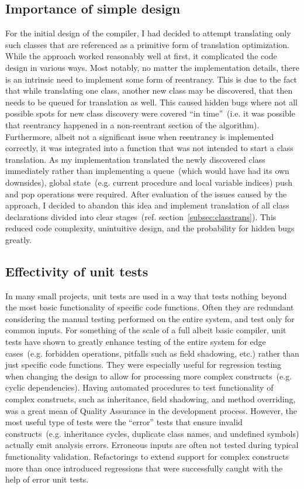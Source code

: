 \documentclass[]{tukportfolio}
\begin{document}
\subsection{Importance of simple design}

For the initial design of the compiler, I had decided to attempt translating only such classes that are referenced as a primitive form of translation optimization. While the approach worked reasonably well at first, it complicated the code design in various ways. Most notably, no matter the implementation details, there is an intrinsic need to implement some form of reentrancy. This is due to the fact that while translating one class, another new class may be discovered, that then needs to be queued for translation as well. This caused hidden bugs where not all possible spots for new class discovery were covered ``in time''~(i.e. it was possible that reentrancy happened in a non-reentrant section of the algorithm). Furthermore, albeit not a significant issue when reentrancy is implemented correctly, it was integrated into a function that was not intended to start a class translation. As my implementation translated the newly discovered class immediately rather than implementing a queue~(which would have had its own downsides), global state~(e.g. current procedure and local variable indices) push and pop operations were required. After evaluation of the issues caused by the approach, I decided to abandon this idea and implement translation of all class declarations divided into clear stages~(ref. section~\ref{subsec:classtrans}). This reduced code complexity, unintuitive design, and the probability for hidden bugs greatly.

\subsection{Effectivity of unit tests}

In many small projects, unit tests are used in a way that tests nothing beyond the most basic functionality of specific code functions. Often they are redundant considering the manual testing performed on the entire system, and test only for common inputs. For something of the scale of a full albeit basic compiler, unit tests have shown to greatly enhance testing of the entire system for edge cases~(e.g. forbidden operations, pitfalls such as field shadowing, etc.) rather than just specific code functions. They were especially useful for regression testing when changing the design to allow for processing more complex constructs~(e.g. cyclic dependencies). Having automated procedures to test functionality of complex constructs, such as inheritance, field shadowing, and method overriding, was a great mean of Quality Assurance in the development process. However, the most useful type of tests were the ``error'' tests that ensure invalid constructs~(e.g. inheritance cycles, duplicate class names, and undefined symbols) actually emit analysis errors. Erroneous inputs are often not tested during typical functionality validation. Refactorings to extend support for complex constructs more than once introduced regressions that were successfully caught with the help of error unit tests.
\end{document}
